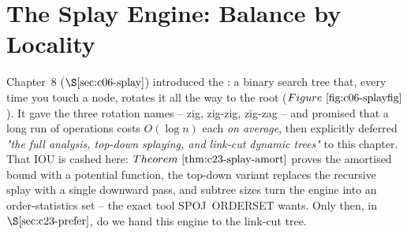 \section{The Splay Engine: Balance by Locality}\label{sec:c23-splay}

\begin{previouslybox}
Chapter~8 (\(\secref{c06-splay}\)) introduced the : a binary
search tree that, every time you touch a node, rotates it all the way to the root
(\(\figref{c06-splayfig}\)). It gave the three rotation names -- zig, zig-zig,
zig-zag -- and promised that a long run of operations costs \(O(\log n)\) each
\emph{on average}, then explicitly deferred \emph{"the full analysis, top-down
splaying, and link-cut dynamic trees"} to this chapter. That IOU is cashed here:
\(\thmref{c23-splay-amort}\) proves the amortised bound with a potential function,
the top-down variant replaces the recursive splay with a single downward pass, and
subtree sizes turn the engine into an order-statistics set -- the exact tool
SPOJ~ORDERSET wants. Only then, in \(\secref{c23-prefer}\), do we hand this engine
to the link-cut tree.
\end{previouslybox}

